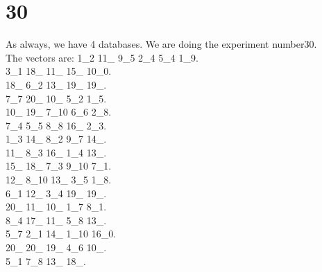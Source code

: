 \chapter{30}
\indent As always, we have 4 databases. We are doing the experiment number30.\\
The vectors are:
1\_2 11\_ 9\_5 2\_4 5\_4 1\_9.\\3\_1 18\_ 11\_ 15\_ 10\_0.\\18\_ 6\_2 13\_ 19\_ 19\_.\\7\_7 20\_ 10\_ 5\_2 1\_5.\\10\_ 19\_ 7\_10 6\_6 2\_8.\\7\_4 5\_5 8\_8 16\_ 2\_3.\\1\_3 14\_ 8\_2 9\_7 14\_.\\11\_ 8\_3 16\_ 1\_4 13\_.\\15\_ 18\_ 7\_3 9\_10 7\_1.\\12\_ 8\_10 13\_ 3\_5 1\_8.\\6\_1 12\_ 3\_4 19\_ 19\_.\\20\_ 11\_ 10\_ 1\_7 8\_1.\\8\_4 17\_ 11\_ 5\_8 13\_.\\5\_7 2\_1 14\_ 1\_10 16\_0.\\20\_ 20\_ 19\_ 4\_6 10\_.\\5\_1 7\_8 13\_ 18\_.\\